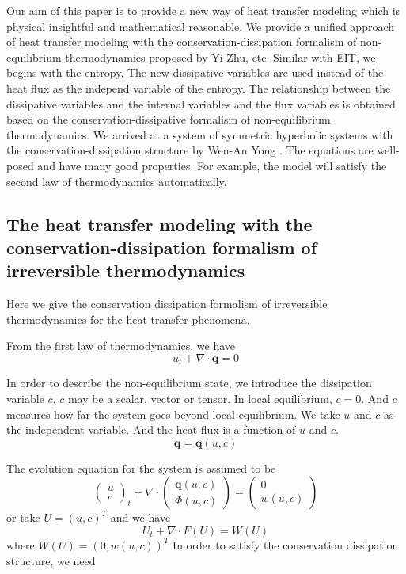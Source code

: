 \documentclass[a4paper]{article}
\begin{document}
Our aim of this paper is to provide a new way of heat transfer modeling which is physical insightful and mathematical reasonable. We provide a unified approach of heat transfer modeling with the conservation-dissipation formalism of non-equilibrium thermodynamics proposed by Yi Zhu, etc.\cite{zhu2014conservation} Similar with EIT, we begins with the entropy. The new dissipative variables are used instead of the heat flux as the independ variable of the entropy. The relationship between the dissipative variables and the internal variables and the flux variables is obtained based on the conservation-dissipative formalism of non-equilibrium thermodynamics. We arrived at a system of symmetric hyperbolic systems with the conservation-dissipation structure by Wen-An Yong \cite{yong2008interesting}. The equations are well-posed and have many good properties. For example, the  model will satisfy the second law of thermodynamics automatically. 


\subsection{The  heat transfer modeling with the conservation-dissipation formalism of irreversible thermodynamics}
Here we give the conservation dissipation formalism of irreversible thermodynamics for the heat transfer phenomena. 

From the first law of thermodynamics, we have
\begin{equation}
u_t+\nabla \cdot \mathbf{q}=0
\end{equation}

In order to describe the non-equilibrium state, we introduce the dissipation variable $c$. $c$ may be a scalar, vector or tensor. In local equilibrium, $c=0$. And $c$ measures how far the system goes beyond local equilibrium. We take $u$ and $c$ as the independent variable. And the heat flux is a function of $u$ and $c$.
\begin{equation}
\mathbf{q}=\mathbf{q}(u,c)
\end{equation}

The evolution equation for the system is assumed to be
\begin{equation}
\left( \begin{array}{ll} u \\ c \end{array} \right)_t +\nabla \cdot \left( \begin{array}{ll} \mathbf{q}(u,c) \\ \Phi(u,c) \end{array} \right) = \left( \begin{array}{ll} 0 \\ w(u,c) \end{array} \right)
\end{equation}
or take $U=(u,c)^T$ and we have
\begin{equation}
U_t+\nabla \cdot F(U)=W(U)
\end{equation}
where $W(U)=(0,w(u,c))^T$
In order to satisfy the conservation dissipation structure, we need 
\end{document}
